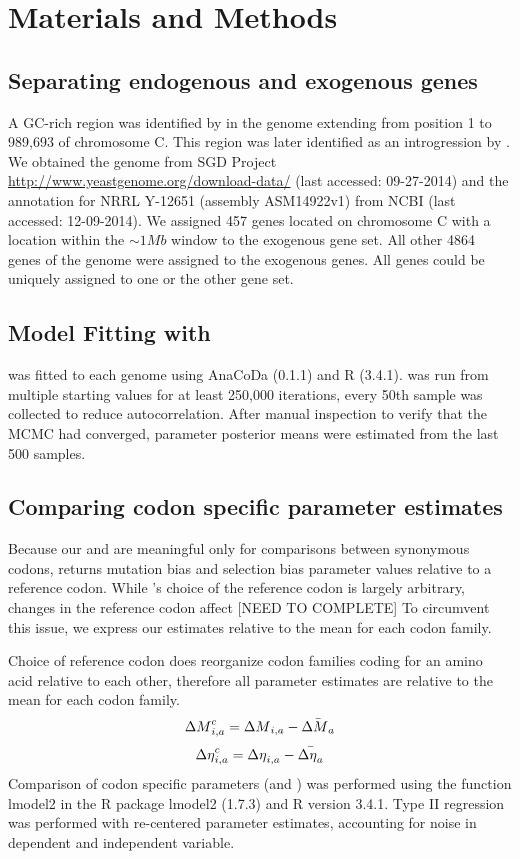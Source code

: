 \documentclass[12pt]{article}
\begin{document}
\section*{Materials and Methods}

\subsection*{Separating endogenous and exogenous genes}
A GC-rich region was identified by \citet{payen2009} in the \kluyveri genome extending from position 1 to 989,693 of chromosome C.
This region was later identified as an introgression by \citet{friedrich2015}.
We obtained the \kluyveri genome from SGD Project \url{http://www.yeastgenome.org/download-data/} (last accessed: 09-27-2014) and the annotation for \kluyveri NRRL Y-12651 (assembly ASM14922v1) from NCBI (last accessed: 12-09-2014).
We assigned 457 genes located on chromosome C with a location within the $\sim 1 Mb$ window to the exogenous gene set.
All other 4864 genes of the \kluyveri genome were assigned to the exogenous genes.
All genes could be uniquely assigned to one or the other gene set.

\subsection*{Model Fitting with \ROC}
\ROC was fitted to each genome using AnaCoDa (0.1.1) \citep{landerer2018} and R (3.4.1).
\ROC was run from multiple starting values for at least 250,000 iterations, every 50th sample was collected to reduce autocorrelation. 
After manual inspection to verify that the MCMC had converged, parameter posterior means were estimated from the last 500 samples.

\subsection*{Comparing codon specific parameter estimates}
Because our \DM and \DE are meaningful only for comparisons between synonymous codons, \ROC returns mutation bias \DM and selection bias \DE parameter values relative to a reference codon.
While \ROC's choice of the reference codon is largely arbitrary, changes in the reference codon affect [NEED TO COMPLETE]
To circumvent this issue, we express our estimates relative to the mean for each codon family.

Choice of reference codon does reorganize codon families coding for an amino acid relative to each other, therefore all parameter estimates are relative to the mean for each codon family.
\begin{equation}
{\Delta M}_{i,a}^c = {\Delta M}_{i,a} - \bar{{\Delta M}_a}
\end{equation}
\begin{equation}
{\Delta \eta}_{i,a}^c = {\Delta \eta}_{i,a} - \bar{{\Delta \eta}_a}
\end{equation}
Comparison of codon specific parameters (\DM and \DE) was performed using the function lmodel2 in the R package lmodel2 (1.7.3) and R version 3.4.1.
Type II regression was performed with re-centered parameter estimates, accounting for noise in dependent and independent variable.
\end{document}
